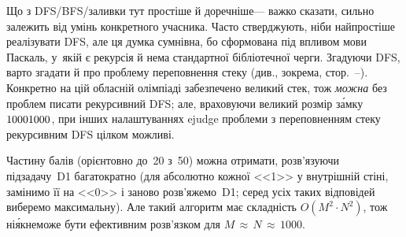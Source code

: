
Що з DFS/BFS/заливки тут простіше й доречніше\nolinebreak[3] --- важко сказати, сильно залежить від умінь конкретного учасника. Часто стверджують, ніби найпростіше реалізувати DFS, але ця думка сумнівна, бо сформована під впливом мови Паскаль, у~якій є рекурсія й нема стандартної бібліотечної черги. 
Згадуючи DFS, варто згадати й про проблему переповнення стеку (див., зокрема, стор.~\mbox{\pageref{text:static-dynamic-and-stack-memory-begin}--\pageref{text:static-dynamic-and-stack-memory-end}}).
Конкретно на цій обласній олімпіаді забезпечено великий стек, тож \emph{можна} без проблем писати рекурсивний DFS; але, враховуючи великий розмір з\'{а}мку $1000{\*}1000$, при інших налаштуваннях ejudge проблеми з переповненням стеку рекурсивним DFS цілком можливі.

Частину балів (орієнтовно до~20 з~50) можна отримати, розв’язуючи підзадачу~D1 багатократно (для абсолютно кожної <<1>> у внутрішній стіні, замінимо її на <<0>> і заново розв’яжемо~D1; серед усіх таких відповідей виберемо максимальну). Але такий алгоритм має складність $O(M^2{\cdot}N^2)$, тож ні\'{я}к\nolinebreak[2] не\nolinebreak[3] може бути ефективним розв’язком для ${M\,{\approx}\,N\,{\approx}\,1000}$.

